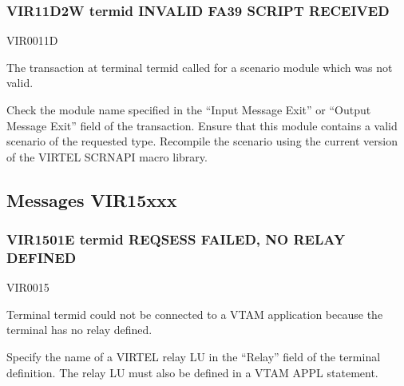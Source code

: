 \documentclass[letterpaper,10pt,english]{sphinxmanual}
\begin{document}
\subsubsection{VIR11D2W termid INVALID FA39 SCRIPT RECEIVED}
\label{\detokenize{messages:vir11d2w-termid-invalid-fa39-script-received}}\begin{description}
\sphinxAtStartPar
VIR0011D

\sphinxAtStartPar
The transaction at terminal termid called for a scenario module which was not valid.

\sphinxAtStartPar
Check the module name specified in the “Input Message Exit” or “Output Message Exit” field of the transaction. Ensure that this module contains a valid scenario of the requested type. Recompile the scenario using the current version of the VIRTEL SCRNAPI macro library.

\end{description}


\subsection{Messages VIR15xxx}
\label{\detokenize{messages:messages-vir15xxx}}

\subsubsection{VIR1501E termid REQSESS FAILED, NO RELAY DEFINED}
\label{\detokenize{messages:vir1501e-termid-reqsess-failed-no-relay-defined}}\begin{description}
\sphinxAtStartPar
VIR0015

\sphinxAtStartPar
Terminal termid could not be connected to a VTAM application because the terminal has no relay defined.

\sphinxAtStartPar
Specify the name of a VIRTEL relay LU in the “Relay” field of the terminal definition. The relay LU must also be defined in a VTAM APPL statement.

\end{description}
\end{document}
